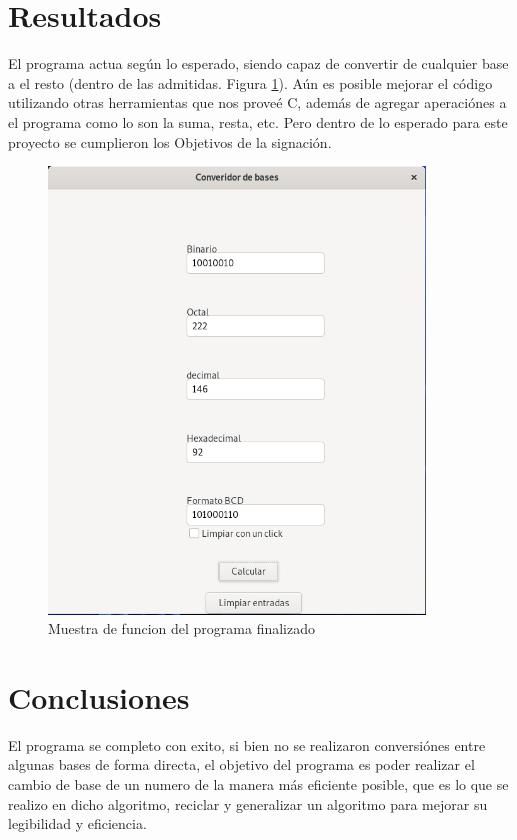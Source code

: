 \documentclass[letterpaper,12pt]{extarticle}%
\begin{document}
	\renewcommand{\labelenumi}{\arabic{enumi}.}
    
    	
    \section{Resultados}
		El programa actua según lo esperado, siendo capaz de convertir de cualquier base a el resto (dentro de las admitidas. Figura \ref{programFuntion}).
		Aún es posible mejorar el código utilizando otras herramientas que nos proveé C, además de agregar aperaciónes a el programa
		como lo son la suma, resta, etc. Pero dentro de lo esperado para este proyecto se cumplieron los Objetivos de la signación.
		
		\begin{figure}[H]
		\begin{center}
		\includegraphics[width=10cm]{imag//programFuntion.png}
		\caption{Muestra de funcion del programa finalizado}
		\label{programFuntion}
		\end{center}
		\end{figure}

	    
	    \section{Conclusiones}
		El programa se completo con exito, si bien no se realizaron conversiónes entre algunas bases
		de forma directa, el objetivo del programa es poder realizar el cambio de base de un numero de
		la manera más eficiente posible, que es lo que se realizo en dicho algoritmo, reciclar y generalizar
		un algoritmo para mejorar su legibilidad y eficiencia.
		
\end{document}

